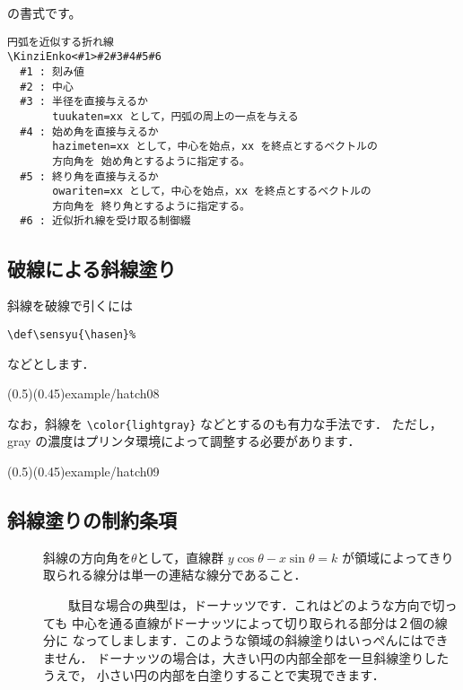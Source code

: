  の書式です。

\begin{boxnote}
\begin{verbatim}
円弧を近似する折れ線
\KinziEnko<#1>#2#3#4#5#6
  #1 : 刻み値
  #2 : 中心
  #3 : 半径を直接与えるか
       tuukaten=xx として，円弧の周上の一点を与える
  #4 : 始め角を直接与えるか
       hazimeten=xx として，中心を始点，xx を終点とするベクトルの
       方向角を 始め角とするように指定する。
  #5 : 終り角を直接与えるか
       owariten=xx として，中心を始点，xx を終点とするベクトルの
       方向角を 終り角とするように指定する。
  #6 : 近似折れ線を受け取る制御綴
\end{verbatim}
\end{boxnote}

\subsection{破線による斜線塗り}\label{S-hasen}
斜線を破線で引くには
\begin{jquote}
\verb/\def\sensyu{\hasen}%/
\end{jquote}
などとします．

\showexample[破線による斜線塗り](0.5)(0.45){example/hatch08}

なお，斜線を \verb/\color{lightgray}/ などとするのも有力な手法です．
ただし，gray の濃度はプリンタ環境によって調整する必要があります．

\showexample[グレースケールによる斜線塗り](0.5)(0.45){example/hatch09}

\subsection{斜線塗りの制約条項}
\begin{description}
\item[]
        斜線の方向角を$\theta$として，直線群 $y\cos\theta-x\sin\theta=k$ 
        が領域によってきり取られる線分は単一の連結な線分であること．

    　　駄目な場合の典型は，ドーナッツです．これはどのような方向で切っても
        中心を通る直線がドーナッツによって切り取られる部分は２個の線分に
        なってしまします．このような領域の斜線塗りはいっぺんにはできません．
        ドーナッツの場合は，大きい円の内部全部を一旦斜線塗りしたうえで，
        小さい円の内部を白塗りすることで実現できます．
\end{description}

